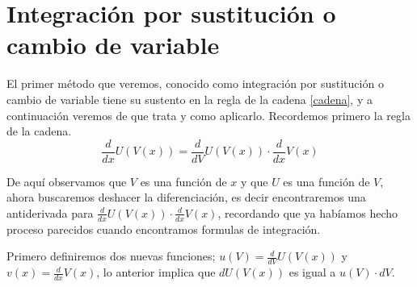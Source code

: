 \documentclass[11pt,letterpaper,oneside]{book}
\numberwithin{equation}{section}
\newcommand{\der}[1][x]{\frac{d}{d#1} }
\begin{document}
	\section{Integración por sustitución o cambio de variable}
	\par El primer método que veremos, conocido como integración por sustitución o cambio de variable tiene su sustento en la regla de la cadena \eqref{cadena}, y a continuación veremos de que trata y como aplicarlo. Recordemos primero la regla de la cadena.
	\begin{equation*}
		\der U(V(x)) = \der[V] U(V(x)) \cdot \der V(x)
	\end{equation*}

	\par De aquí observamos que $V$ es una función de $x$ y que $U$ es una función de $V$, ahora buscaremos deshacer la diferenciación, es decir encontraremos una antiderivada para $\der U(V(x)) \cdot \der V(x)$, recordando que ya habíamos hecho proceso parecidos cuando encontramos formulas de integración.
	
	\par Primero definiremos dos nuevas funciones; $u(V)=\der[V] U(V(x))$ y $v(x)=\der V(x)$, lo anterior implica que  $dU(V(x))$ es igual a  $u(V) \cdot dV$.
	
\end{document}
